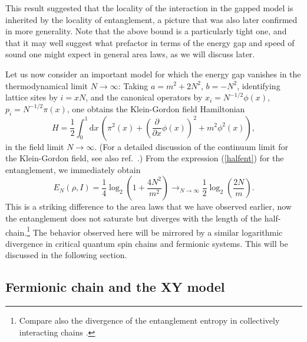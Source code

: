 \documentclass[12pt, rmp,floatfix,epsfig,graphics]{revtex4} %
\newcommand{\md}{\mathrm{d}}
\begin{document}
This result suggested that the locality of the interaction
in the gapped model is inherited by the locality of
entanglement, a picture that was also later confirmed
in more generality. Note that the above bound is a
particularly tight one, and that it may well suggest what 
prefactor in terms of the energy gap and speed of sound
one might expect in general area laws, as we will discuss
later.

Let us now consider an important model for which the energy 
gap vanishes in the thermodynamical limit $N\rightarrow\infty$:
Taking $a=m^2+2N^2$, $b=-N^2$, identifying lattice sites by 
$i=xN$, and the canonical operators by $x_i=N^{-1/2}\phi(x)$, 
$p_i=N^{-1/2}\pi(x)$, one obtains the Klein-Gordon field 
Hamiltonian
\begin{equation}
\label{KG}
        {H}=\frac{1}{2}\int_{0}^1\!\!\md x\,\left(\pi^2(x)
        +\left(\frac{\partial}{\partial x}\phi(x)\right)^2
        +m^2\phi^2(x)\right),
\end{equation}
in the field limit $N\rightarrow\infty$. 
(For a detailed discussion of the continuum limit for the Klein-Gordon
field, see also ref.\ \cite{Botero}.)  From the expression 
(\ref{halfent}) for the entanglement, we immediately obtain
\begin{equation}
\label{KGLogNeg}
        E_{N}(\rho,I)=\frac{1}{4}\log_2\left(1+\frac{4N^2}{m^2}\right)
        \rightarrow_{N\rightarrow\infty} \frac{1}{2}\log_2 \left(\frac{2N}{m}\right).
\end{equation}
This is a striking difference to the 
area laws that we have 
observed earlier, now the entanglement does not saturate but
diverges with the length of the half-chain.\footnote{Compare also 
the divergence of the entanglement entropy in collectively
interacting chains \cite{Fleischhauer}.} The behavior 
observed here will be mirrored by a similar logarithmic 
divergence in critical quantum spin chains and fermionic
systems. This will be discussed in the following section.

\subsection{Fermionic chain and the XY model} 
\end{document}
